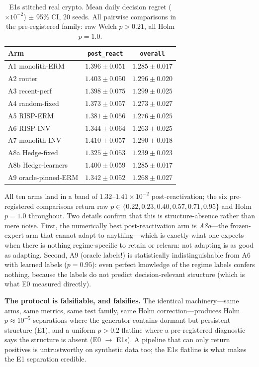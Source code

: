 \documentclass[11pt,a4paper]{article}
\theoremstyle{definition}
\theoremstyle{plain}
\begin{document}
\begin{table}[h]
\centering
\caption{E1s stitched real crypto. Mean daily decision regret
($\times 10^{-2}$) $\pm$ 95\% CI, 20 seeds. All pairwise comparisons in the
pre-registered family: raw Welch $p > 0.21$, all Holm $p = 1.0$.}
\label{tab:dd5-e1s}
\small
\begin{tabular}{lcc}
\toprule
Arm & \texttt{post\_react} & \texttt{overall} \\
\midrule
A1 monolith-ERM      & $1.396 \pm 0.051$ & $1.285 \pm 0.017$ \\
A2 router            & $1.403 \pm 0.050$ & $1.296 \pm 0.020$ \\
A3 recent-perf       & $1.398 \pm 0.075$ & $1.299 \pm 0.025$ \\
A4 random-fixed      & $1.373 \pm 0.057$ & $1.273 \pm 0.027$ \\
A5 RISP-ERM      & $1.381 \pm 0.056$ & $1.276 \pm 0.025$ \\
A6 RISP-INV      & $1.344 \pm 0.064$ & $1.263 \pm 0.025$ \\
A7 monolith-INV      & $1.410 \pm 0.057$ & $1.290 \pm 0.018$ \\
A8a Hedge-fixed      & $1.325 \pm 0.053$ & $1.239 \pm 0.023$ \\
A8b Hedge-learners   & $1.400 \pm 0.059$ & $1.285 \pm 0.017$ \\
A9 oracle-pinned-ERM & $1.342 \pm 0.052$ & $1.268 \pm 0.027$ \\
\bottomrule
\end{tabular}
\end{table}

All ten arms land in a band of $1.32$--$1.41 \times 10^{-2}$
post-reactivation; the six pre-registered comparisons return raw
$p \in \{0.22, 0.23, 0.40, 0.57, 0.71, 0.95\}$ and Holm $p = 1.0$
throughout. Two details confirm that this is structure-absence rather than
mere noise. First, the numerically best post-reactivation arm is
\emph{A8a}---the frozen-expert arm that cannot adapt to anything---which is
exactly what one expects when there is nothing regime-specific to retain or
relearn: not adapting is as good as adapting. Second, A9 (oracle labels!)
is statistically indistinguishable from A6 with learned labels
($p = 0.95$): even perfect knowledge of the regime labels confers nothing,
because the labels do not predict decision-relevant structure (which is
what E0 measured directly).

\begin{keypoint}
\textbf{The protocol is falsifiable, and falsifies.} The identical
machinery---same arms, same metrics, same test family, same Holm
correction---produces Holm $p \approx 10^{-5}$ separations where the
generator contains dormant-but-persistent structure (E1), and a uniform
$p > 0.2$ flatline where a pre-registered diagnostic says the structure is
absent (E0 $\to$ E1s). A pipeline that can only return positives is
untrustworthy on synthetic data too; the E1s flatline is what makes the E1
separation credible.
\end{keypoint}
\end{document}
